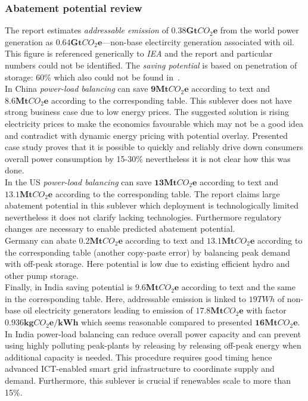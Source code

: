 \documentclass[11pt, twocolumn]{article}
\begin{document}
\subsubsection{Abatement potential review}
The report estimates \emph{addressable emission} of $\mathbf{0.38Gt}CO_2\mathbf{e}$ from the world power generation as $\mathbf{0.64Gt}CO_2\mathbf{e}$---non-base electircity generation associated with oil. This figure is referenced generically to \emph{IEA} and the report and particular numbers could not be identified. The \emph{saving potential} is based on penetration of storage: 60\% which also could not be found in~\citep{pieper2011revisiting}.\\

In China \emph{power-load balancing} can save $\mathbf{9} \mathbf{Mt}CO_2\mathbf{e}$ according to text and $\mathbf{8.6} \mathbf{Mt}CO_2\mathbf{e}$ according to the corresponding table. This sublever does not have strong business case due to low energy prices. The suggested solution is rising electricity prices to make the economics favourable which may not be a good idea and contradict with dynamic energy pricing with potential overlay. Presented case study proves that it is possible to quickly and reliably drive down consumers overall power consumption by 15-30\% nevertheless it is not clear how this was done.\\

In the US \emph{power-load balancing} can save $\mathbf{13} \mathbf{Mt}CO_2\mathbf{e}$ according to text and $\mathbf{13.1} \mathbf{Mt}CO_2\mathbf{e}$ according to the corresponding table. The report claims large abatement potential in this sublever which deployment is technologically limited nevertheless it does not clarify lacking technologies. Furthermore regulatory changes are necessary to enable predicted abatement potential.\\

Germany can abate $\mathbf{0.2} \mathbf{Mt}CO_2\mathbf{e}$ according to text and $\mathbf{13.1} \mathbf{Mt}CO_2\mathbf{e}$ according to the corresponding table (another copy-paste error) by balancing peak demand with off-peak storage. Here potential is low due to existing efficient hydro and other pump storage.\\

Finally, in India saving potential is $\mathbf{9.6} \mathbf{Mt}CO_2\mathbf{e}$ according to text and the same in the corresponding table. Here, addressable emission is linked to $19TWh$ of non-base oil electricity generators leading to emission of $\mathbf{17.8} \mathbf{Mt}CO_2\mathbf{e}$ with factor $\mathbf{0.936 kg}CO_2\mathbf{e}/\mathbf{kWh}$ which seems reasonable compared to presented $\mathbf{16} \mathbf{Mt}CO_2\mathbf{e}$.\\
In India power-load balancing can reduce overall power capacity and can prevent using highly polluting peak-plants by releasing by releasing off-peak energy when additional capacity is needed. This procedure requires good timing hence advanced ICT-enabled smart grid infrastructure to coordinate supply and demand. Furthermore, this sublever is crucial if renewables scale to more than 15\%.\\
\end{document}
